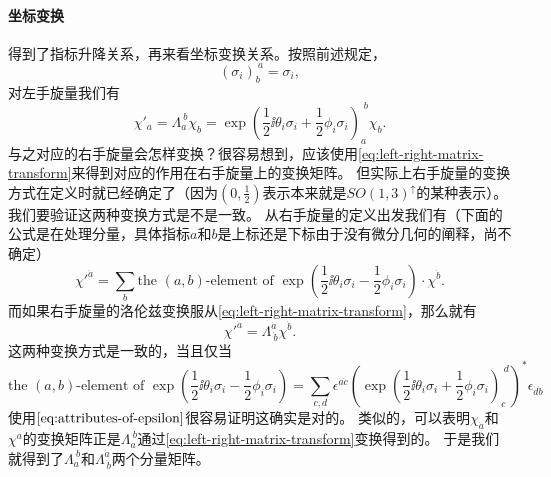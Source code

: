 \paragraph{坐标变换} 得到了指标升降关系，再来看坐标变换关系。按照前述规定，
\[
    (\sigma_i)_b^{\ a} = \sigma_i,
\]
对左手旋量我们有
\[
    \chi'_a = \Lambda_a^{\ b} \chi_b = \exp \left( \frac{1}{2} \ii \theta_i \sigma_i + \frac{1}{2} \phi_i \sigma_i \right)_a^{\; b} \chi_b.
\]
与之对应的右手旋量会怎样变换？很容易想到，应该使用\eqref{eq:left-right-matrix-transform}来得到对应的作用在右手旋量上的变换矩阵。
但实际上右手旋量的变换方式在定义时就已经确定了（因为$(0, \frac{1}{2})$表示本来就是$SO(1,3)^\uparrow$的某种表示）。
我们要验证这两种变换方式是不是一致。
从右手旋量的定义出发我们有（下面的公式是在处理分量，具体指标$a$和$b$是上标还是下标由于没有微分几何的阐释，尚不确定）
\[
    {\chi'}^{\dot{a}} = \sum_b \text{the $(a,b)$-element of } \exp \left( \frac{1}{2} \ii \theta_i \sigma_i - \frac{1}{2} \phi_i \sigma_i \right) \cdot \chi^{\dot{b}} .
\]
而如果右手旋量的洛伦兹变换服从\eqref{eq:left-right-matrix-transform}，那么就有
\[
    {\chi'}^{\dot{a}} = \Lambda^{\dot{a}}_{\ \dot{b}} \chi^{\dot{b}}.
\]
这两种变换方式是一致的，当且仅当
\[
    \text{the $(a,b)$-element of } \exp \left( \frac{1}{2} \ii \theta_i \sigma_i - \frac{1}{2} \phi_i \sigma_i \right) = \sum_{c,d} \epsilon^{\dot{a} \dot{c}} \left(\exp \left( \frac{1}{2} \ii \theta_i \sigma_i + \frac{1}{2} \phi_i \sigma_i \right)_c^{\; d}\right)^* \epsilon_{\dot{d} \dot{b}}
\]
使用$\eqref{eq:attributes-of-epsilon}$很容易证明这确实是对的。
类似的，可以表明$\chi_{\dot{a}}$和$\chi^a$的变换矩阵正是$\Lambda_a^{\ b}$通过\eqref{eq:left-right-matrix-transform}变换得到的。
于是我们就得到了$\Lambda_a^{\ b}$和$\Lambda^{\dot{a}}_{\ \dot{b}}$两个分量矩阵。

